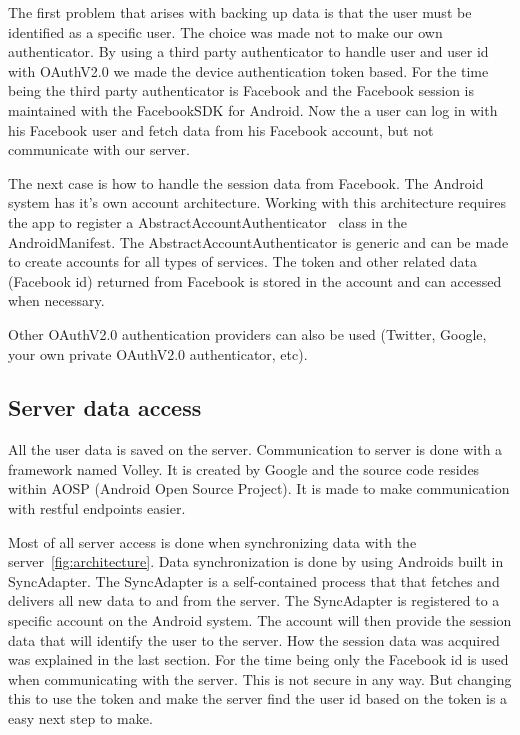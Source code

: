 The first problem that arises with backing up data is that the user must be identified as a specific user. The choice was made not to make our own authenticator. By using a third party authenticator to handle user and user id with OAuthV2.0 we made the device authentication token based. 
For the time being the third party authenticator is Facebook and the Facebook session is maintained with the FacebookSDK for Android. 
Now the a user can log in with his Facebook user and fetch data from his Facebook account, but not communicate with our server. 

The next case is how to handle the session data from Facebook. The Android system has it's own account architecture. Working with this architecture requires the app to register a AbstractAccountAuthenticator~\cite{androidAccount} class in the AndroidManifest. The AbstractAccountAuthenticator is generic and can be made to create accounts for all types of services. The token and other related data (Facebook id) returned from Facebook is stored in the account and can accessed when necessary.

Other OAuthV2.0 authentication providers can also be used (Twitter, Google, your own private OAuthV2.0 authenticator, etc). 


\subsection{Server data access}

All the user data is saved on the server. Communication to server is done with a framework named Volley. It is created by Google and the source code resides within AOSP (Android Open Source Project). It is made to make communication with restful endpoints easier.

Most of all server access is done when synchronizing data with the server~\ref{fig:architecture}. 
Data synchronization is done by using Androids built in SyncAdapter. The SyncAdapter is a self-contained process that that fetches and delivers all new data to and from the server. The SyncAdapter is registered to a specific account on the Android system. The account will then provide the session data that will identify the user to the server. How the session data was acquired was explained in the last section. For the time being only the Facebook id is used when communicating with the server. This is not secure in any way. But changing this to use the token and make the server find the user id based on the token is a easy next step to make.


